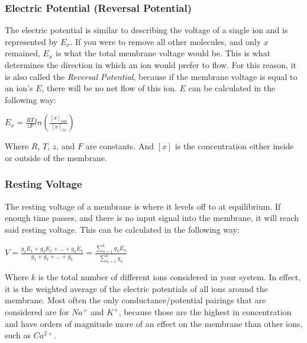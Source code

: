 \documentclass[12pt]{amsart}
\begin{document}
\subsubsection{Electric Potential (Reversal Potential)} The electric potential is similar to describing the voltage of a single ion and is represented by $E_x$. If you were to remove all other molecules, and only $x$ remained, $E_x$ is what the total membrane voltage would be. This is what determines the direction in which an ion would prefer to flow. For this reason, it is also called the \textit{Reversal Potential}, because if the membrane voltage is equal to an ion's $E$, there will be no net flow of this ion. $E$ can be calculated in the following way: 

\medskip

\begin{center}
    
    $E_x = \frac{RT}{zF}ln(\frac{[x]_{out}}{[x]_{in}})$
    
\end{center}

\medskip

Where $R$, $T$, $z$, and $F$ are constants. And $[x]$ is the concentration either inside or outside of the membrane.

\subsubsection{Resting Voltage} The resting voltage of a membrane is where it levels off to at equilibrium. If enough time passes, and there is no input signal into the membrane, it will reach said resting voltage. This can be calculated in the following way: 

\medskip

\begin{center}

    $V = \frac{g_1E_1 + g_2E_2 + ... + g_kE_k}{g_1 + g_2 + ... + g_k} = \frac{\sum_{n=1}^k g_nE_n}{\sum_{n=1}^k g_n}$
    
\end{center}

\medskip

Where $k$ is the total number of different ions considered in your system. In effect, it is the weighted average of the electric potentials of all ions around the membrane. Most often the only conductance/potential pairings that are considered are for $Na^+$ and $K^+$, because those are the highest in concentration and have orders of magnitude more of an effect on the membrane than other ions, such as $Ca^{2+}$.
\end{document}
